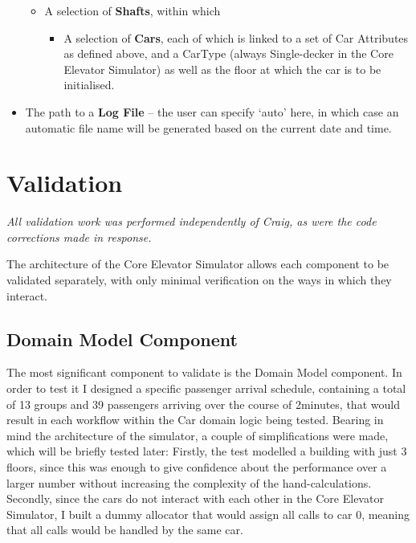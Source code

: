 \documentclass{UoYCSproject}
\begin{document}
\begin{itemize}
	\begin{itemize}
		\item A selection of \textbf{Shafts}, within which
		\begin{itemize}
			\item A selection of \textbf{Cars}, each of which is linked to a set of Car Attributes as defined above, and a CarType (always Single-decker in the Core Elevator Simulator) as well as the floor at which the car is to be initialised.
		\end{itemize}
	\end{itemize}
	\item The path to a \textbf{Log File} -- the user can specify `auto' here, in which case an automatic file name will be generated based on the current date and time.
\end{itemize}

\section{Validation}

\textit{All validation work was performed independently of Craig, as were the code corrections made in response.}

The architecture of the Core Elevator Simulator allows each component to be validated separately, with only minimal verification on the ways in which they interact.

\subsection{Domain Model Component}

The most significant component to validate is the Domain Model component.  In order to test it I designed a specific passenger arrival schedule, containing a total of 13 groups and 39 passengers arriving over the course of 2\textonehalf minutes, that would result in each workflow within the Car domain logic being tested.  Bearing in mind the architecture of the simulator, a couple of simplifications were made, which will be briefly tested later:  Firstly, the test modelled a building with just 3 floors, since this was enough to give confidence about the performance over a larger number without increasing the complexity of the hand-calculations.  Secondly, since the cars do not interact with each other in the Core Elevator Simulator, I built a dummy allocator that would assign all calls to car 0, meaning that all calls would be handled by the same car.
\end{document}
